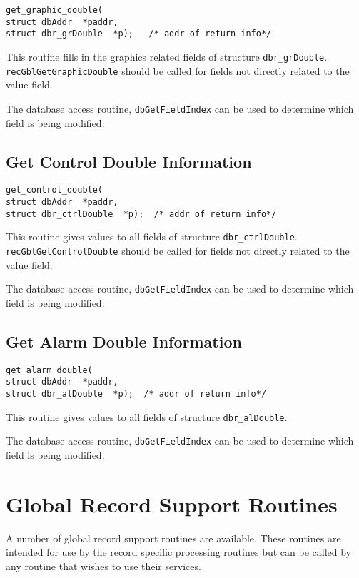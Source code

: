 \begin{verbatim}get_graphic_double(
struct dbAddr  *paddr,
struct dbr_grDouble  *p);   /* addr of return info*/
\end{verbatim}This routine fills in the graphics related fields of structure \verb|dbr_grDouble|. \verb|recGblGetGraphicDouble| should be 
called for fields not directly related to the value field.

The database access routine, \verb|dbGetFieldIndex| can be used to determine which field is being modified.

\subsection{Get Control Double Information}

\begin{verbatim}get_control_double(
struct dbAddr  *paddr,
struct dbr_ctrlDouble  *p);  /* addr of return info*/
\end{verbatim}This routine gives values to all fields of structure \verb|dbr_ctrlDouble|. \verb|recGblGetControlDouble| should be called 
for fields not directly related to the value field.

The database access routine, \verb|dbGetFieldIndex| can be used to determine which field is being modified.

\subsection{Get Alarm Double Information}

\begin{verbatim}get_alarm_double(
struct dbAddr  *paddr,
struct dbr_alDouble  *p);  /* addr of return info*/
\end{verbatim}This routine gives values to all fields of structure \verb|dbr_alDouble|.

The database access routine, \verb|dbGetFieldIndex| can be used to determine which field is being modified.

\section{Global Record Support Routines}

A number of global record support routines are available. These routines are intended for use by the record specific 
processing routines but can be called by any routine that wishes to use their services.

